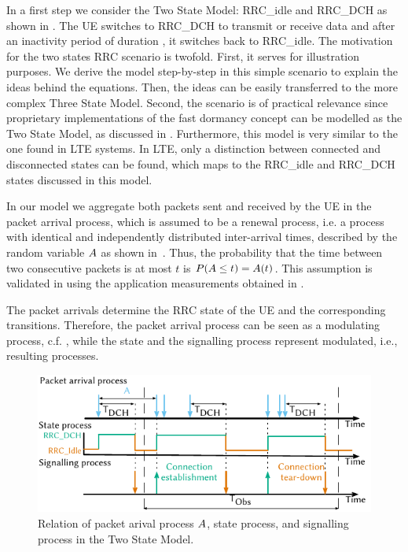 In a first step we consider the Two State Model: \gls{RRC_idle} and \gls{RRC_DCH} as shown in .
The \gls{UE} switches to \gls{RRC_DCH} to transmit or receive data and after an inactivity period of duration \TDCH, it switches back to \gls{RRC_idle}.
The motivation for the two states \gls{RRC} scenario is twofold.
First, it serves for illustration purposes.
We derive the model step-by-step in this simple scenario to explain the ideas behind the equations.
Then, the ideas can be easily transferred to the more complex Three State Model.
Second, the scenario is of practical relevance since proprietary implementations of the fast dormancy concept can be modelled as the Two State Model, as discussed in .
Furthermore, this model is very similar to the one found in \gls{LTE} systems.
In \gls{LTE}, only a distinction between connected and disconnected states can be found, which maps to the \gls{RRC_idle} and \gls{RRC_DCH} states discussed in this model.

In our model we aggregate both packets sent and received by the \gls{UE} in the packet arrival process, which is assumed to be a renewal process, i.e. a process  with identical and independently distributed inter-arrival times, described by the random variable \(A\) as shown in~.
Thus, the probability that the time between two consecutive packets is at most \(t\) is \(P(A \leq t) = A(t)\).
This assumption is validated in  using the application measurements obtained in .

The packet arrivals determine the \gls{RRC} state of the \gls{UE} and the corresponding transitions. Therefore, the packet arrival process can be seen as a modulating process, c.f. \cite{TranGia1983,TranGia1988}, while the state and the signalling process represent modulated, i.e., resulting processes.

\begin{figure}
  \centering
  \includegraphics{network/performance_model/analytical_model/figures/arrival_process}
  \caption{Relation of packet arival process \(A\), state process, and signalling process in the Two State Model.}
  \label{fig:network:performance_model:system_description:arrival_process}
\end{figure}

